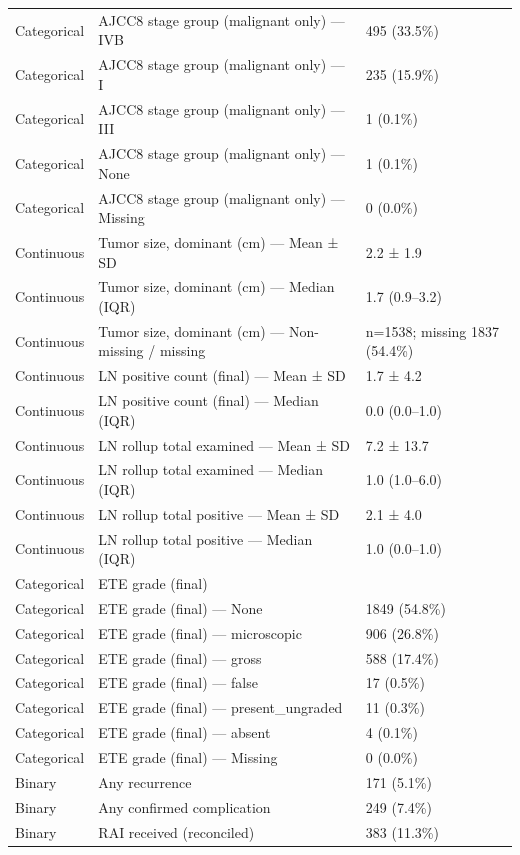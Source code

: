 \begin{table}[htbp]
\begin{tabular}{lll}
Categorical & AJCC8 stage group (malignant only) — IVB & 495 (33.5\%) \\
Categorical & AJCC8 stage group (malignant only) — I & 235 (15.9\%) \\
Categorical & AJCC8 stage group (malignant only) — III & 1 (0.1\%) \\
Categorical & AJCC8 stage group (malignant only) — None & 1 (0.1\%) \\
Categorical & AJCC8 stage group (malignant only) — Missing & 0 (0.0\%) \\
Continuous & Tumor size, dominant (cm) — Mean ± SD & 2.2 ± 1.9 \\
Continuous & Tumor size, dominant (cm) — Median (IQR) & 1.7 (0.9–3.2) \\
Continuous & Tumor size, dominant (cm) — Non-missing / missing & n=1538; missing 1837 (54.4\%) \\
Continuous & LN positive count (final) — Mean ± SD & 1.7 ± 4.2 \\
Continuous & LN positive count (final) — Median (IQR) & 0.0 (0.0–1.0) \\
Continuous & LN rollup total examined — Mean ± SD & 7.2 ± 13.7 \\
Continuous & LN rollup total examined — Median (IQR) & 1.0 (1.0–6.0) \\
Continuous & LN rollup total positive — Mean ± SD & 2.1 ± 4.0 \\
Continuous & LN rollup total positive — Median (IQR) & 1.0 (0.0–1.0) \\
Categorical & ETE grade (final) &  \\
Categorical & ETE grade (final) — None & 1849 (54.8\%) \\
Categorical & ETE grade (final) — microscopic & 906 (26.8\%) \\
Categorical & ETE grade (final) — gross & 588 (17.4\%) \\
Categorical & ETE grade (final) — false & 17 (0.5\%) \\
Categorical & ETE grade (final) — present\_ungraded & 11 (0.3\%) \\
Categorical & ETE grade (final) — absent & 4 (0.1\%) \\
Categorical & ETE grade (final) — Missing & 0 (0.0\%) \\
Binary & Any recurrence & 171 (5.1\%) \\
Binary & Any confirmed complication & 249 (7.4\%) \\
Binary & RAI received (reconciled) & 383 (11.3\%) \\

\end{tabular}
\end{table}
